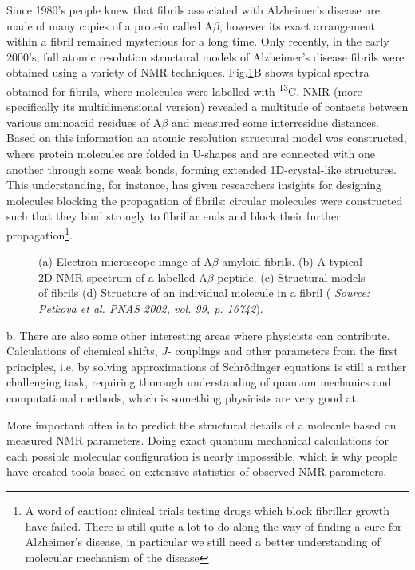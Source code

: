 \documentclass[a4paper, 12pt]{article}
\begin{document}
Since 1980's people knew that fibrils associated with Alzheimer's disease are made of many copies of a protein called A$\beta$, however its exact arrangement within a fibril remained mysterious for a long time. Only recently, in the early 2000's, full atomic resolution structural models of Alzheimer's disease fibrils were obtained using a variety of NMR techniques. Fig.\ref{fig:fibrils}B shows typical spectra obtained for fibrils, where molecules were labelled with \textsuperscript{13}C. NMR (more specifically its multidimensional version) revealed a multitude of contacts between various aminoacid residues of A$\beta$ and measured some interresidue distances. Based on this information an atomic resolution structural model was constructed, where protein molecules are folded in U-shapes and are connected with one another through some weak bonds, forming extended 1D-crystal-like structures. This understanding, for instance, has given researchers insights for designing molecules blocking the propagation of fibrils: circular molecules were constructed such that they bind strongly to fibrillar ends and block their further propagation\footnote{A word of caution: clinical trials testing drugs which block fibrillar growth have failed. There is still quite a lot to do along the way of finding a cure for Alzheimer's disease, in particular we still need a better understanding of molecular mechanism of the disease}.

\begin{figure}[ht]
\caption{(a) Electron microscope image of A$\beta$ amyloid fibrils. (b) A typical 2D NMR spectrum of a labelled A$\beta$ peptide. (c) Structural models of fibrils (d) Structure of an individual molecule in a fibril ( \textit{Source: Petkova et al. PNAS 2002, vol. 99, p. 16742}).}
\label{fig:fibrils}
\centering
\end{figure}


b. There are also some other interesting areas where physicists can contribute. Calculations of chemical shifts, $J$- couplings and other parameters from the first principles, i.e. by solving approximations of Schr{\"o}dinger equations is still a rather challenging task, requiring thorough understanding of quantum mechanics and computational methods, which is something physicists are very good at.

  More important often is to predict the structural details of a molecule based on measured NMR parameters. Doing exact quantum mechanical calculations for each possible molecular configuration is nearly imposssible, which is why people have created tools based on extensive statistics of observed NMR parameters. 
 
\end{document}
